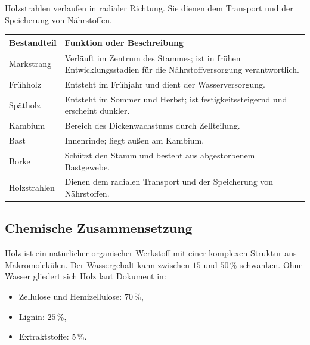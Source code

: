\documentclass[
  12pt,
  a4paper,
  oneside
]{scrreprt}
\begin{document}
Holzstrahlen verlaufen in radialer Richtung. Sie dienen dem Transport
und der Speicherung von Nährstoffen. 

\begin{longtable}{
  >{\raggedright\arraybackslash}p{}
  >{\raggedright\arraybackslash}p{}
}
\toprule
\textbf{Bestandteil} &
\textbf{Funktion oder Beschreibung} \\
\midrule
\endhead

Markstrang &
Verläuft im Zentrum des Stammes; ist in frühen Entwicklungsstadien für
die Nährstoffversorgung verantwortlich. \\

Frühholz &
Entsteht im Frühjahr und dient der Wasserversorgung. \\

Spätholz &
Entsteht im Sommer und Herbst; ist festigkeitssteigernd und erscheint
dunkler. \\

Kambium &
Bereich des Dickenwachstums durch Zellteilung. \\

Bast &
Innenrinde; liegt außen am Kambium. \\

Borke &
Schützt den Stamm und besteht aus abgestorbenem Bastgewebe. \\

Holzstrahlen &
Dienen dem radialen Transport und der Speicherung von Nährstoffen. \\

\bottomrule
\end{longtable}



\subsection{Chemische Zusammensetzung}

Holz ist ein natürlicher organischer Werkstoff mit einer komplexen
Struktur aus Makromolekülen. Der Wassergehalt kann zwischen
$15$ und $50\,\%$ schwanken. Ohne Wasser gliedert sich Holz laut
Dokument in:

\begin{itemize}
  \item Zellulose und Hemizellulose: $70\,\%$,
  \item Lignin: $25\,\%$,
  \item Extraktstoffe: $5\,\%$.
\end{itemize}
\end{document}
